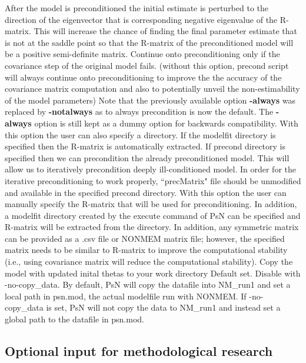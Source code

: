 \begin{optionlist}
After the model is preconditioned the initial estimate is perturbed to the direction of the eigenvector that is corresponding negative eigenvalue of the R-matrix.  This will increase the chance of finding the final parameter estimate that is not at the saddle point so that the R-matrix of the preconditioned model will be a positive semi-definite matrix.
\nextopt
{}
Continue onto preconditioning only if the covariance step of the original model fails.  (without this option, precond script will always continue onto preconditioning to improve the the accuracy of the covariance matrix computation and also to potentially unveil the non-estimability of the model parameters)  Note that the previously available option {\bf -always} was replaced by {\bf -notalways} as to always precondition is now the default. The {\bf -always} option is still kept as a dummy option for backwards compatibility.
\nextopt
{}
With this option the user can also specify a directory.  If the modelfit directory is specified then the R-matrix is automatically extracted.  If precond directory is specified then we can precondition the already preconditioned model.  This will allow us to iteratively precondition deeply ill-conditioned model.  In order for the iterative preconditioning to work properly, ``precMatrix" file should be unmodified and available in the specified precond directory.
\nextopt
{}
With this option the user can manually specify the R-matrix that will be used for preconditioning.  In addition, a modelfit directory created by the execute command of PsN can be specified and R-matrix will be extracted from the directory.  In addition, any symmetric matrix can be provided as a .csv file or NONMEM matrix file; however, the specified matrix needs to be similar to R-matrix to improve the computational stability (i.e., using covariance matrix will reduce the computational stability).
\nextopt
{}
Copy the model with updated inital thetas to your work directory	
\nextopt
{}
Default set. Disable with -no-copy\_data. By default, PsN will copy the datafile into NM\_run1 and set a local path in psn.mod, the actual modelfile run with NONMEM. If -no-copy\_data is set, PsN will not copy the data to NM\_run1 and instead set a global path to the datafile in psn.mod.
\nextopt
\end{optionlist}

\subsection{Optional input for methodological research}

